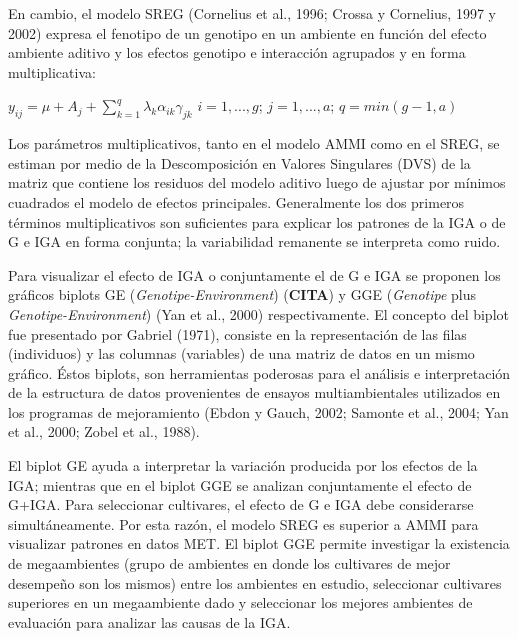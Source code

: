 En cambio, el modelo SREG (Cornelius et al., 1996; Crossa y Cornelius, 1997 y 2002) expresa el fenotipo de un genotipo en un ambiente en función del efecto ambiente aditivo y los efectos genotipo e interacción agrupados y en forma multiplicativa:
\begin{center}
$y_{ij}= \mu +  A_j + \sum_{k=1}^q \lambda_k \alpha_{ik} \gamma_{jk}$ \hspace{0.5cm} $ i=1,...,g$;\hspace{0.15cm} $ j=1,...,a$; \hspace{0.15cm} $q=min(g-1,a)$
\end{center} 

Los parámetros multiplicativos, tanto en el modelo AMMI como en el SREG, se estiman por medio de la Descomposición en Valores Singulares (DVS) de la matriz que contiene los residuos del modelo aditivo luego de ajustar por mínimos cuadrados el modelo de efectos principales. Generalmente los dos primeros términos multiplicativos son suficientes para explicar los patrones de la IGA o de G e IGA en forma conjunta; la variabilidad remanente se interpreta como ruido. 

Para visualizar el efecto de IGA o conjuntamente el de G e IGA se proponen los gráficos biplots GE (\emph{Genotipe-Environment}) (\textbf{CITA}) y GGE (\emph{Genotipe} plus \emph{Genotipe-Environment}) (Yan et al., 2000) respectivamente. El concepto del biplot fue presentado por Gabriel (1971), consiste en la representación de las filas (individuos) y las columnas (variables) de una matriz de datos en un mismo gráfico. Éstos biplots, son herramientas poderosas para el análisis e interpretación de la estructura de datos provenientes de ensayos multiambientales utilizados en los programas de mejoramiento (Ebdon y Gauch, 2002; Samonte et al., 2004; Yan et al., 2000; Zobel et al., 1988).

El biplot GE ayuda a interpretar la variación producida por los efectos de la IGA; mientras que en el biplot GGE se analizan conjuntamente el efecto de G+IGA. Para seleccionar cultivares, el efecto de G e IGA debe considerarse simultáneamente. Por esta razón, el modelo SREG es superior a AMMI para visualizar patrones en datos MET. El biplot GGE permite investigar la existencia de megaambientes (grupo de ambientes en donde los cultivares de mejor desempeño son los mismos) entre los ambientes en estudio, seleccionar cultivares superiores en un megaambiente dado y seleccionar los mejores ambientes de evaluación para analizar las causas de la IGA.

